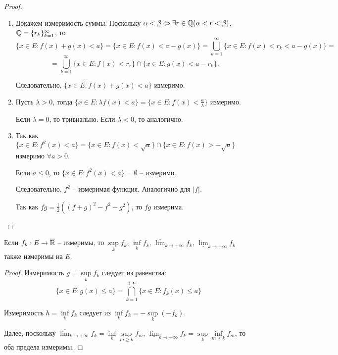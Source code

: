 \begin{proof}
    \begin{enumerate}
        \item Докажем измеримость суммы. Поскольку $\alpha < \beta \Leftrightarrow \exists r \in \mathbb{Q} (\alpha < r < \beta)$, $\mathbb{Q} = \{r_{k}\}_{k = 1}^{\infty}$, то 
        \[\{x \in E: f(x) + g(x) < a\} = \{x \in E: f(x) < a - g(x)\} = \bigcup_{k = 1}^{\infty}\{x \in E: f(x) < r_{k} < a - g(x)\} = \]
        \[= \bigcup_{k = 1}^{\infty}\{x \in E: f(x) < r_{r}\} \cap \{x \in E: g(x) < a - r_{k}\}.\]
    
        Следовательно, $\{x \in E: f(x) + g(x) < a\}$ измеримо.

        \item Пусть $\lambda > 0$, тогда $\{x \in E: \lambda f(x) < a\} = \{x \in E: f(x) < \frac{a}{\lambda}\}$ измеримо.
    
        Если $\lambda = 0$, то тривиально. Если $\lambda < 0$, то аналогично.

        \item Так как $\{x \in E: f^{2}(x) < a\} = \{x \in E: f(x) < \sqrt{a}\} \cap \{x \in E: f(x) > -\sqrt{a}\}$ измеримо $\forall a > 0$.
    
        Если $a \leq 0$, то $\{x \in E: f^{2}(x) < a\} = \emptyset$ -- измеримо.
    
        Следовательно, $f^{2}$ -- измеримая функция. Аналогично для $|f|$.
    
        Так как $fg = \frac{1}{2}\left((f + g)^{2} - f^{2} - g^{2}\right)$, то $fg$ измерима.
    \end{enumerate}
\end{proof}

\begin{theorem}
    Если $f_{k}: E \to \overline{\mathbb{R}}$ -- измеримы, то $\underset{k}{\sup}f_{k}$, $\underset{k}{\inf}f_{k}$, $\overline{\lim}_{k \to +\infty}f_{k}$, $\underline{\lim}_{k \to +\infty}f_{k}$ также измеримы на $E$.
\end{theorem}

\begin{proof}
    Измеримость $g = \underset{k}{\sup}f_{k}$ следует из равенства:
    \[\{x \in E: g(x) \leq a\} = \bigcap_{k = 1}^{+\infty}\{x \in E: f_{k}(x) \leq a\}\]

    Измеримость $h = \underset{k}{\inf}f_{k}$ следует из $\underset{k}{\inf}f_{k} = -\underset{k}{\sup}(-f_{k})$.

    Далее, поскольку $\overline{\lim}_{k \to +\infty}f_{k} = \underset{k}{\inf}\underset{m \geq k}{\sup}f_{m}$, $\underline{\lim}_{k \to +\infty}f_{k} = \underset{k}{\sup}\underset{m \geq k}{\inf}f_{m}$, то оба предела измеримы.
\end{proof}


